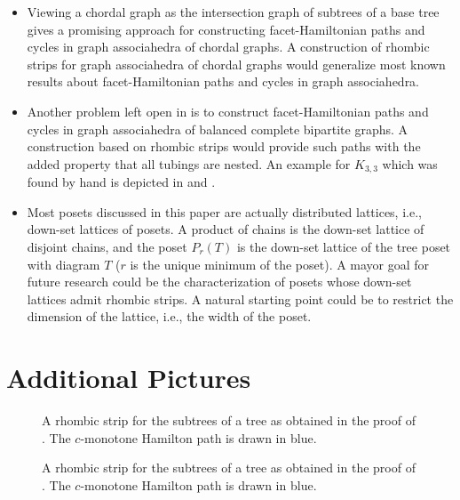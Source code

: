 \documentclass[fontsize=11pt,a4paper,DIV=12]{scrartcl}
\begin{document}
\begin{itemize}
    \item Viewing a chordal graph as the intersection graph of subtrees of a
base tree gives a promising approach for constructing facet-Hamiltonian paths
and cycles in graph associahedra of chordal graphs. A construction of
rhombic strips for graph associahedra of chordal graphs would generalize
most known results about facet-Hamiltonian paths and cycles in graph
associahedra.
    \item Another problem left open in \cite{facethamiltonicity} is to
construct facet-Hamiltonian paths and cycles in graph associahedra of balanced
complete bipartite graphs. A construction based on rhombic strips would
provide such paths with the added property that all tubings are nested. An example for $K_{3,3}$ which was found by hand is depicted in  and .
    \item Most posets discussed in this paper are actually distributed lattices,
i.e., down-set lattices of posets. A product of chains is the down-set lattice of
disjoint chains, and the poset $P_r(T)$ is the down-set lattice of the tree poset
with diagram $T$ ($r$ is the unique minimum of the poset). A mayor goal for
future research could be the characterization of posets whose down-set
lattices admit rhombic strips. A natural starting point could be to
restrict the dimension of the lattice, i.e., the width of the poset.
\end{itemize}


\begin{refcontext}[sorting=none] %
\printbibliography
\end{refcontext}

\pagebreak

\appendix

\section{Additional Pictures}

\begin{figure}[ht]
    \centering
    
    \caption{A rhombic strip for the subtrees of a tree as obtained in the proof of . The $c$-monotone Hamilton path is drawn in blue.}
    \label{fig:8 node tree rs}
\end{figure}

\begin{figure}[ht]
    \centering
    
    \caption{A rhombic strip for the subtrees of a tree as obtained in the proof of . The $c$-monotone Hamilton path is drawn in blue.}
    \label{fig:10 node tree rs}
\end{figure}
\end{document}

